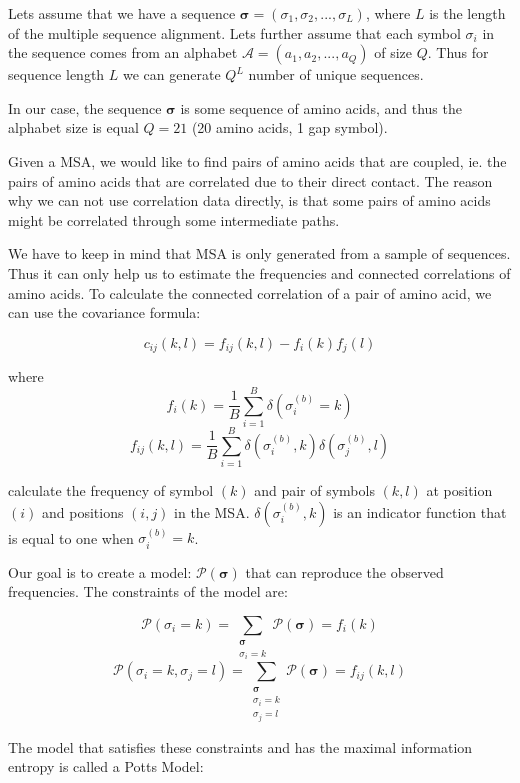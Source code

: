 Lets assume that we have a sequence $\boldsymbol{\sigma} = (\sigma_1, \sigma_2, ..., \sigma_L)$, where $L$ is the length of the multiple sequence alignment. 
Lets further assume that each symbol $\sigma_i$ in the sequence comes from an alphabet $\mathcal{A} = (a_1, a_2, ..., a_Q)$ of size $Q$. 
Thus for sequence length $L$ we can generate $Q^L$ number of unique sequences.
    
In our case, the sequence $\boldsymbol{\sigma}$ is some sequence of amino acids, and thus the alphabet size is equal $Q = 21$ (20 amino acids, 1 gap symbol).
        
Given a MSA, we would like to find pairs of amino acids that are coupled, ie. the pairs of amino acids that are correlated due to their direct contact. 
The reason why we can not use correlation data directly, is that some pairs of amino acids might be correlated through some intermediate paths.
        
We have to keep in mind that MSA is only generated from a sample of sequences. 
Thus it can only help us to estimate the frequencies and connected correlations of amino acids. 
To calculate the connected correlation of a pair of amino acid, we can use the covariance formula:
            
$$c_{ij}(k, l) = f_{ij}(k, l) - f_i(k) f_j(l)$$
        
where
$$f_i(k) = \frac{1}{B} \sum_{i = 1}^B \delta(\sigma_i^{(b)} = k)$$
$$f_{ij}(k, l) = \frac{1}{B} \sum_{i = 1}^B \delta(\sigma_i^{(b)}, k)\delta(\sigma_j^{(b)}, l)$$
        
calculate the frequency of symbol $(k)$ and pair of symbols $(k, l)$ at position $(i)$ and positions $(i, j)$ in the MSA. 
$\delta(\sigma_i^{(b)}, k)$ is an indicator function that is equal to one when $\sigma_i^{(b)} = k$.
        
        
Our goal is to create a model: $\mathcal{P(\bm{\sigma})}$ that can reproduce the observed frequencies. 
The constraints of the model are:
        
$$\mathcal{P}(\sigma_i = k) = \sum_{\substack{\bm{\sigma}\\ \sigma_i = k}} \mathcal{P}(\bm{\sigma}) = f_i(k)$$
$$\mathcal{P}(\sigma_i = k, \sigma_j = l) = \sum_{\substack{\bm{\sigma}\\ \sigma_i = k \\ \sigma_j = l}} \mathcal{P}(\bm{\sigma}) = f_{ij}(k, l)$$
        
The model that satisfies these constraints and has the maximal information entropy is called a Potts Model:
        

